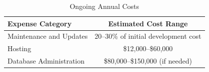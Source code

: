 \begin{table}[h]
    \centering
    \begin{tabular}{|l|c|}
        \hline
        \textbf{Expense Category} & \textbf{Estimated Cost Range} \\
        \hline
        Maintenance and Updates & 20--30\% of initial development cost \\
        \hline
        Hosting & \$12,000--\$60,000 \\
        \hline
        Database Administration & \$80,000--\$150,000 (if needed) \\
        \hline
    \end{tabular}
    \caption{Ongoing Annual Costs}\label{tab:running-costs}
\end{table}